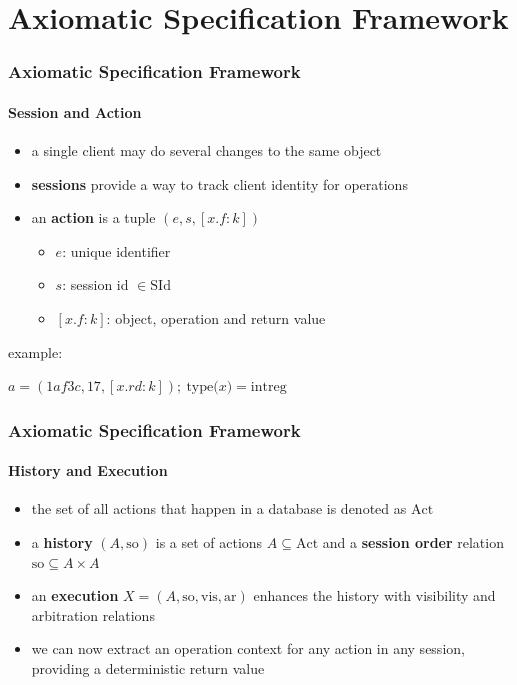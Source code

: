 \documentclass[11pt]{beamer}
\begin{document}
\section{Axiomatic Specification Framework}

\begin{frame}
\frametitle{Axiomatic Specification Framework}
\framesubtitle{Session and Action}
\begin{itemize}
\item a single client may do several changes to the same object
\item \textbf{sessions} provide a way to track client identity for operations
\item an \textbf{action} is a tuple \((e,s,[x.f:k])\)
\begin{itemize}
\item \(e\): unique identifier
\item \(s\): session id \(\in \mathrm{SId}\)
\item \([x.f:k]\): object, operation and return value
\end{itemize}
\end{itemize}
\pause
example:

\begin{center}
\(a = (1af3c, 17, [x.rd: k]);\ \mathrm{type(}x\mathrm{)} = \mathrm{intreg}\)
\end{center}
\end{frame}

\begin{frame}
\frametitle{Axiomatic Specification Framework}
\framesubtitle{History and Execution}
\begin{itemize}
\item the set of all actions that happen in a database is denoted as \(\mathrm{Act}\)
\item a \textbf{history} \((A,\mathrm{so})\) is a set of actions \(A \subseteq \mathrm{Act}\) and a \textbf{session order} relation \(\mathrm{so} \subseteq A \times A \)
\item an \textbf{execution} \(X = (A, \mathrm{so, vis, ar})\) enhances the history with visibility and arbitration relations
\item we can now extract an operation context for any action in any session, providing a deterministic return value
\end{itemize}

\end{frame}
\end{document}
